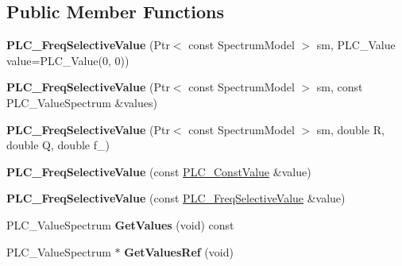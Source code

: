 \subsection*{\-Public \-Member \-Functions}
\begin{DoxyCompactItemize}
\item 
\hypertarget{classns3_1_1PLC__FreqSelectiveValue_a298f02eb9eb06fed26e92d8b4bbe21da}{{\bfseries \-P\-L\-C\-\_\-\-Freq\-Selective\-Value} (\-Ptr$<$ const \-Spectrum\-Model $>$ sm, \-P\-L\-C\-\_\-\-Value value=\-P\-L\-C\-\_\-\-Value(0, 0))}\label{classns3_1_1PLC__FreqSelectiveValue_a298f02eb9eb06fed26e92d8b4bbe21da}

\item 
\hypertarget{classns3_1_1PLC__FreqSelectiveValue_a591668eaa70485ca628ea164848761ec}{{\bfseries \-P\-L\-C\-\_\-\-Freq\-Selective\-Value} (\-Ptr$<$ const \-Spectrum\-Model $>$ sm, const \-P\-L\-C\-\_\-\-Value\-Spectrum \&values)}\label{classns3_1_1PLC__FreqSelectiveValue_a591668eaa70485ca628ea164848761ec}

\item 
\hypertarget{classns3_1_1PLC__FreqSelectiveValue_a3132049982f2fce4991c3c3a3b8df1fa}{{\bfseries \-P\-L\-C\-\_\-\-Freq\-Selective\-Value} (\-Ptr$<$ const \-Spectrum\-Model $>$ sm, double \-R, double \-Q, double f\-\_)}\label{classns3_1_1PLC__FreqSelectiveValue_a3132049982f2fce4991c3c3a3b8df1fa}

\item 
\hypertarget{classns3_1_1PLC__FreqSelectiveValue_aff84e273e755f40deb5e01388fdbc1cd}{{\bfseries \-P\-L\-C\-\_\-\-Freq\-Selective\-Value} (const \hyperlink{classns3_1_1PLC__ConstValue}{\-P\-L\-C\-\_\-\-Const\-Value} \&value)}\label{classns3_1_1PLC__FreqSelectiveValue_aff84e273e755f40deb5e01388fdbc1cd}

\item 
\hypertarget{classns3_1_1PLC__FreqSelectiveValue_a3c7438ab82c9f617d1422aff7c493756}{{\bfseries \-P\-L\-C\-\_\-\-Freq\-Selective\-Value} (const \hyperlink{classns3_1_1PLC__FreqSelectiveValue}{\-P\-L\-C\-\_\-\-Freq\-Selective\-Value} \&value)}\label{classns3_1_1PLC__FreqSelectiveValue_a3c7438ab82c9f617d1422aff7c493756}

\item 
\hypertarget{classns3_1_1PLC__FreqSelectiveValue_a4fe621a33725f7b3ed70e23dcfcac83f}{\-P\-L\-C\-\_\-\-Value\-Spectrum {\bfseries \-Get\-Values} (void) const }\label{classns3_1_1PLC__FreqSelectiveValue_a4fe621a33725f7b3ed70e23dcfcac83f}

\item 
\hypertarget{classns3_1_1PLC__FreqSelectiveValue_ae7d573170ae90976dbea63a8425a38e4}{\-P\-L\-C\-\_\-\-Value\-Spectrum $\ast$ {\bfseries \-Get\-Values\-Ref} (void)}\label{classns3_1_1PLC__FreqSelectiveValue_ae7d573170ae90976dbea63a8425a38e4}


\end{DoxyCompactItemize}
